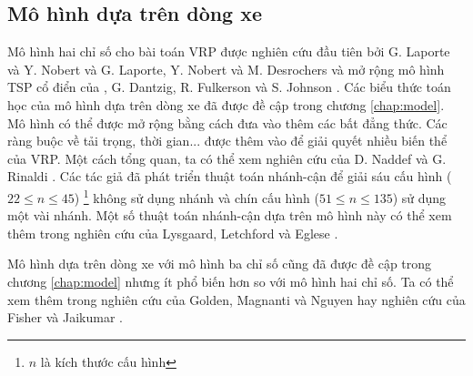 \subsection{Mô hình dựa trên dòng xe}
Mô hình hai chỉ số cho bài toán VRP được nghiên cứu đầu tiên bởi G. Laporte và Y. Nobert \cite{laporte1983branch} và G. Laporte, Y. Nobert và M. Desrochers \cite{laporte1985optimal} và mở rộng mô hình TSP cổ điển của , G. Dantzig, R. Fulkerson và S. Johnson \cite{dantzig1954solution}. Các biểu thức toán học của mô hình dựa trên dòng xe đã được đề cập trong chương \ref{chap:model}. Mô hình có thể được mở rộng bằng cách đưa vào thêm các bất đẳng thức. Các ràng buộc về tải trọng, thời gian... được thêm vào để giải quyết nhiều biến thể của VRP. Một cách tổng quan, ta có thể  xem nghiên cứu của D. Naddef và G. Rinaldi \cite{naddef2002branch}. Các tác giả đã phát triển thuật toán nhánh-cận để giải sáu cấu hình ($22 \leq n \leq 45$) \footnote[1]{$n$ là kích thước cấu hình} không sử dụng nhánh và chín cấu hình ($51 \leq n \leq 135$) sử dụng một vài nhánh. Một số thuật toán nhánh-cận dựa trên mô hình này có thể xem thêm trong nghiên cứu của Lysgaard, Letchford và Eglese \cite{lysgaard2004new}. 


Mô hình dựa trên dòng xe với mô hình ba chỉ số cũng đã được đề cập trong chương \ref{chap:model} nhưng ít phổ biến hơn so với mô hình hai chỉ số. Ta có thể xem thêm trong nghiên cứu của Golden, Magnanti và Nguyen \cite{golden1977implementing} hay nghiên cứu của Fisher và Jaikumar \cite{fisher1981generalized}.

